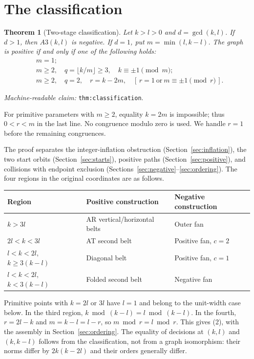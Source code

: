 \documentclass[11pt]{amsart}
\newcommand{\record}[1]{\nolinkurl{#1}}
\newtheorem{theorem}{Theorem}
\newcommand{\claimid}[1]{\par\nopagebreak\noindent\textit{Machine-readable claim:} \record{#1}.\par}
\begin{document}
\section{The classification}\label{sec:classification}
\begin{theorem}[Two-stage classification]\label{thm:classification}
Let $k>l>0$ and $d=\gcd(k,l)$. If $d>1$, then $A3(k,l)$ is negative.
If $d=1$, put $m=\min(l,k-l)$. The graph is positive if and only if
one of the following holds:
\begin{equation}\label{eq:2}
\begin{aligned}
 &m=1;\\
 &m\ge2,\quad q=\lfloor k/m\rfloor\ge3,\quad k\equiv\pm1\pmod m;\\
 &m\ge2,\quad q=2,\quad r=k-2m,\quad
       [\,r=1\ \text{or}\ m\equiv\pm1\pmod r\,].
\end{aligned}\tag{2}
\end{equation}
\end{theorem}
\claimid{thm:classification}
For primitive parameters with $m\ge2$, equality $k=2m$ is impossible;
thus $0<r<m$ in the last line. No congruence modulo zero is used.
We handle $r=1$ before the remaining congruences.

The proof separates the integer-inflation obstruction
(Section~\ref{sec:inflation}), the two start orbits
(Section~\ref{sec:starts}), positive paths (Section~\ref{sec:positive}),
and collisions with endpoint exclusion
(Sections~\ref{sec:negative}--\ref{sec:ordering}). The four regions
in the original coordinates are as follows.
\begin{center}\small
\begin{tabular}{lll}\toprule
Region & Positive construction & Negative construction\\\midrule
$k>3l$ & AR vertical/horizontal belts & Outer fan\\
$2l<k<3l$ & AT second belt & Positive fan, $c=2$\\
$l<k<2l$, $k\ge3(k-l)$ & Diagonal belt & Positive fan, $c=1$\\
$l<k<2l$, $k<3(k-l)$ & Folded second belt & Negative fan\\\bottomrule
\end{tabular}\end{center}
Primitive points with $k=2l$ or $3l$ have $l=1$ and belong to
the unit-width case below. In the third region, $k\bmod(k-l)=l\bmod(k-l)$.
In the fourth, $r=2l-k$ and $m=k-l=l-r$, so $m\bmod r=l\bmod r$.
This gives (2), with the assembly in Section~\ref{sec:ordering}.
The equality of decisions at $(k,l)$ and $(k,k-l)$ follows from the
classification, not from a graph isomorphism: their norms differ by
$2k(k-2l)$ and their orders generally differ.
\end{document}
